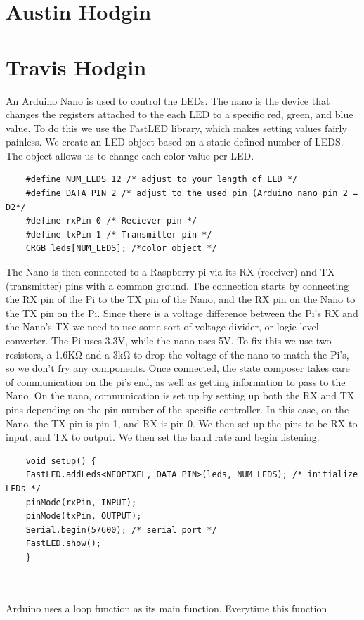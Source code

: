 \documentclass[onecolumn, draftclsnofoot,10pt, compsoc]{IEEEtran}
\begin{document}
	\section{Austin Hodgin}
	\section{Travis Hodgin}
	An Arduino Nano is used to control the LEDs. The nano is the device that
	changes the registers attached to the each LED to a specific red, green,
	and blue value. To do this we use the FastLED library, which makes setting
	values fairly painless. We create an LED object based on a static defined
	number of LEDS. The object allows us to change each color value
	per LED.
	\begin{lstlisting}
	#define NUM_LEDS 12 /* adjust to your length of LED */
	#define DATA_PIN 2 /* adjust to the used pin (Arduino nano pin 2 = D2*/
	#define rxPin 0 /* Reciever pin */
	#define txPin 1 /* Transmitter pin */
	CRGB leds[NUM_LEDS]; /*color object */
	\end{lstlisting}
	The Nano is then connected to a Raspberry pi via its RX (receiver)
	and TX (transmitter) pins with a common ground. The connection starts by
	connecting the RX pin of the Pi to the TX pin of the Nano, and the RX pin on
	the Nano to the TX pin on the Pi. Since there is a voltage difference between
	the Pi’s RX and the Nano’s TX we need to use some sort of voltage divider, or
	logic level converter. The Pi uses 3.3V, while the nano uses 5V. To fix this
	we use two resistors, a 1.6KΩ and a 3kΩ to drop the voltage of the nano to
	match the Pi’s, so we don’t fry any components. Once connected, the state composer
	takes care of communication on the pi’s end, as well as getting information to
	pass to the Nano. On the nano, communication is set up by setting up both the
	RX and TX pins depending on the pin number of the specific controller. In this
	case, on the Nano, the TX pin is pin 1, and RX is pin 0. We then set up the pins to be RX to input,
	and TX to output. We then set the baud rate and begin listening.
	\begin{lstlisting}
	void setup() {
  	FastLED.addLeds<NEOPIXEL, DATA_PIN>(leds, NUM_LEDS); /* initialize LEDs */
  	pinMode(rxPin, INPUT);
  	pinMode(txPin, OUTPUT);
  	Serial.begin(57600); /* serial port */
  	FastLED.show();
	}
	\end{lstlisting}
	\\\\
	\noindent Arduino uses a loop function as its main function. Everytime this function
\end{document}

